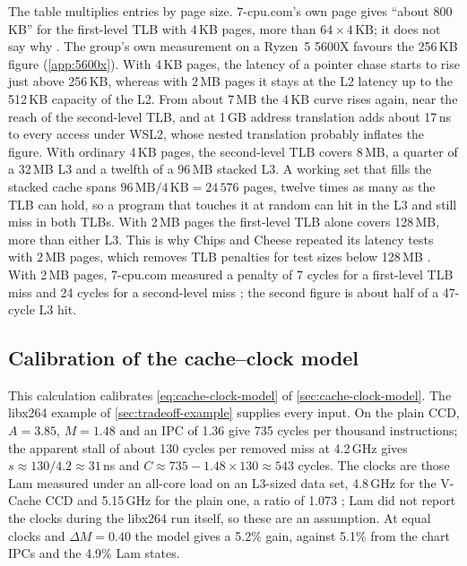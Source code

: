 The table multiplies entries by page size. 7-cpu.com's own page gives ``about 800\,KB'' for the first-level TLB with 4\,KB pages, more than $64 \times 4$\,KB; it does not say why \cite{7-cpu.comAMDZen3}. The group's own measurement on a Ryzen~5 5600X favours the 256\,KB figure (\cref{app:5600x}). With 4\,KB pages, the latency of a pointer chase starts to rise just above 256\,KB, whereas with 2\,MB pages it stays at the L2 latency up to the 512\,KB capacity of the L2. From about 7\,MB the 4\,KB curve rises again, near the reach of the second-level TLB, and at 1\,GB address translation adds about 17\,ns to every access under WSL2, whose nested translation probably inflates the figure. With ordinary 4\,KB pages, the second-level TLB covers 8\,MB, a quarter of a 32\,MB L3 and a twelfth of a 96\,MB stacked L3. A working set that fills the stacked cache spans $96\,\text{MB}/4\,\text{KB} = 24\,576$ pages, twelve times as many as the TLB can hold, so a program that touches it at random can hit in the L3 and still miss in both TLBs. With 2\,MB pages the first-level TLB alone covers 128\,MB, more than either L3. This is why Chips and Cheese repeated its latency tests with 2\,MB pages, which removes TLB penalties for test sizes below 128\,MB \cite{cozmaDeepDivingZen2022}. With 2\,MB pages, 7-cpu.com measured a penalty of 7 cycles for a first-level TLB miss and 24 cycles for a second-level miss \cite{7-cpu.comAMDZen3}; the second figure is about half of a 47-cycle L3 hit.

\subsection{Calibration of the cache--clock model}
\label{app:cache-clock}
This calculation calibrates \cref{eq:cache-clock-model} of \cref{sec:cache-clock-model}. The libx264 example of \cref{sec:tradeoff-example} supplies every input. On the plain CCD, $A = 3.85$, $M = 1.48$ and an IPC of 1.36 give 735 cycles per thousand instructions; the apparent stall of about 130 cycles per removed miss at 4.2\,GHz gives $s \approx 130/4.2 \approx 31$\,ns and $C \approx 735 - 1.48 \times 130 \approx 543$ cycles. The clocks are those Lam measured under an all-core load on an L3-sized data set, 4.8\,GHz for the V-Cache CCD and 5.15\,GHz for the plain one, a ratio of 1.073 \cite{lamAMDs7950X3DZen2023}; Lam did not report the clocks during the libx264 run itself, so these are an assumption. At equal clocks and $\Delta M = 0.40$ the model gives a 5.2\% gain, against 5.1\% from the chart IPCs and the 4.9\% Lam states.

